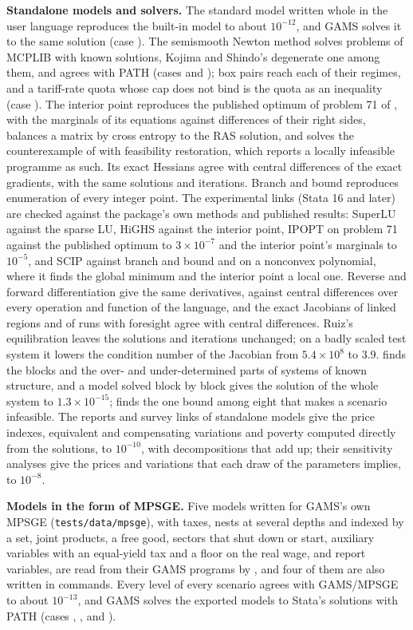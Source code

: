 \textbf{Standalone models and solvers.} The standard model written whole in
the user language reproduces the built-in model to about $10^{-12}$, and GAMS
solves it to the same solution (case ). The semismooth
Newton method solves problems of MCPLIB with known solutions, Kojima and
Shindo's degenerate one among them, and agrees with PATH (cases
 and ); box pairs reach each of their regimes,
and a tariff-rate quota whose cap does not bind is the quota as an
inequality (case ). The interior point reproduces the published
optimum of problem 71 of \citet{hock1981}, with the marginals of its
equations against differences of their right sides, balances a matrix by
cross entropy to the RAS solution, and solves the counterexample of
\citet{wachter2000} with feasibility restoration, which reports a locally
infeasible programme as such. Its exact Hessians agree with central
differences of the exact gradients, with the same solutions and iterations.
Branch and bound reproduces enumeration of every integer point. The
experimental links (Stata 16 and later) are checked against the package's
own methods and published results: SuperLU against the sparse LU, HiGHS
against the interior point, IPOPT on problem 71 against the published
optimum to $3 \times 10^{-7}$ and the interior point's marginals to
$10^{-5}$, and SCIP against branch and bound and on a nonconvex polynomial,
where it finds the global minimum and the interior point a local one.
Reverse and forward differentiation give the same derivatives, against
central differences over every operation and function of the language, and
the exact Jacobians of linked regions and of runs with foresight agree with
central differences. Ruiz's equilibration leaves the solutions and
iterations unchanged; on a badly scaled test system it lowers the condition
number of the Jacobian from $5.4 \times 10^8$ to 3.9. 
finds the blocks and the over- and under-determined parts of systems of
known structure, and a model solved block by block gives the solution of the
whole system to $1.3 \times 10^{-15}$;  finds the one bound
among eight that makes a scenario infeasible. The reports and survey links
of standalone models give the price indexes, equivalent and compensating
variations and poverty computed directly from the solutions, to
$10^{-10}$, with decompositions that add up; their sensitivity analyses give
the prices and variations that each draw of the parameters implies, to
$10^{-8}$.

\textbf{Models in the form of MPSGE.} Five models written for GAMS's own
MPSGE (\texttt{tests/data/mpsge}), with taxes, nests at several depths and
indexed by a set, joint products, a free good, sectors that shut down or
start, auxiliary variables with an equal-yield tax and a floor on the real
wage, and report variables, are read from their GAMS programs by
, and four of them are also written in commands. Every
level of every scenario agrees with GAMS/MPSGE to about $10^{-13}$, and GAMS
solves the exported models to Stata's solutions with PATH (cases
, ,  and ).

